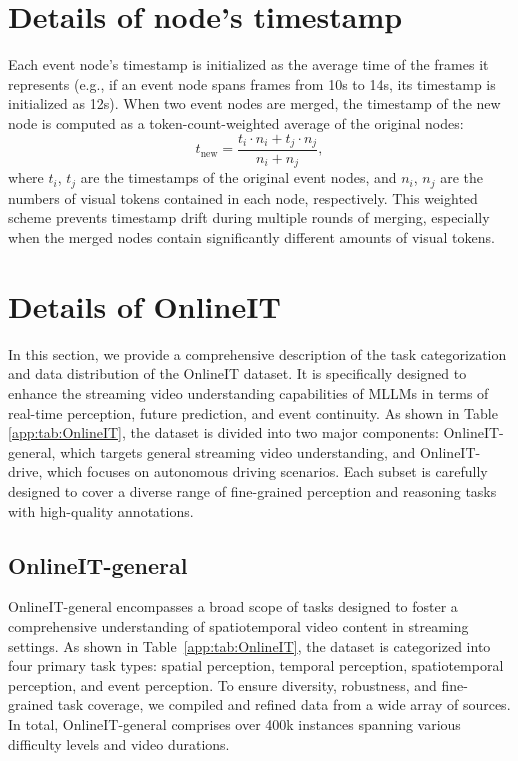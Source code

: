 \section{Details of node's timestamp}
\label{app:sec:Details_of_node_timestamp}

Each event node's timestamp is initialized as the average time of the frames it represents (e.g., if an event node spans frames from 10s to 14s, its timestamp is initialized as 12s). When two event nodes are merged, the timestamp of the new node is computed as a token-count-weighted average of the original nodes:
\begin{equation}
t_{\text{new}} = \frac{t_i \cdot n_i + t_j \cdot n_j}{n_i + n_j},
\end{equation}
where $t_i$, $t_j$ are the timestamps of the original event nodes, and $n_i$, $n_j$ are the numbers of visual tokens contained in each node, respectively. This weighted scheme prevents timestamp drift during multiple rounds of merging, especially when the merged nodes contain significantly different amounts of visual tokens.

\section{Details of OnlineIT}
\label{app:sec:Details_of_OnlineIT}
In this section, we provide a comprehensive description of the task categorization and data distribution of the OnlineIT dataset. It is specifically designed to enhance the streaming video understanding capabilities of MLLMs in terms of real-time perception, future prediction, and event continuity. As shown in Table \ref{app:tab:OnlineIT}, the dataset is divided into two major components: OnlineIT-general, which targets general streaming video understanding, and OnlineIT-drive, which focuses on autonomous driving scenarios. Each subset is carefully designed to cover a diverse range of fine-grained perception and reasoning tasks with high-quality annotations.




\subsection{OnlineIT-general}
\label{app:sec:Details_of_OnlineIT:OnlineIT-general}
OnlineIT-general encompasses a broad scope of tasks designed to foster a comprehensive understanding of spatiotemporal video content in streaming settings. As shown in Table~\ref{app:tab:OnlineIT}, the dataset is categorized into four primary task types: spatial perception, temporal perception, spatiotemporal perception, and event perception. To ensure diversity, robustness, and fine-grained task coverage, we compiled and refined data from a wide array of sources. In total, OnlineIT-general comprises over 400k instances spanning various difficulty levels and video durations.

